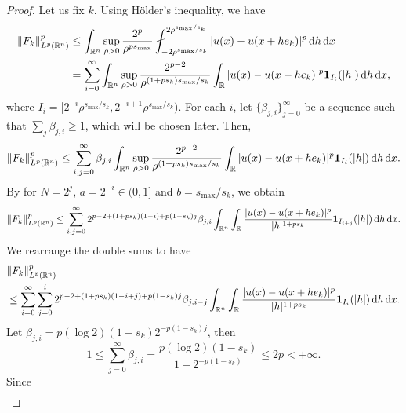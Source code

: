 \documentclass[11pt]{amsart}
\theoremstyle{plain}
\theoremstyle{definition}
\numberwithin{equation}{section}
\begin{document}
\begin{proof}
Let us fix $k$. Using H\"older's inequality, we have
\begin{equation*}
\begin{split}
\|F_k\|_{L^p(\mathbb{R}^n)}^p
&\leq \int_{\mathbb{R}^n} \sup_{\rho > 0} \frac{2^p}{\rho^{ps_{\max}}} \fint_{-2\rho^{s_{\max}/s_k}}^{2\rho^{s_{\max}/s_k}} |u(x) - u(x+he_k)|^p \,\mathrm{d}h \,\mathrm{d}x \\
&= \sum_{i=0}^\infty \int_{\mathbb{R}^n} \sup_{\rho > 0} \frac{2^{p-2}}{\rho^{(1+ps_k)s_{\max}/s_k}} \int_{\mathbb{R}} |u(x) - u(x+he_k)|^p {\bf 1}_{I_i}(|h|) \,\mathrm{d}h \,\mathrm{d}x,
\end{split}
\end{equation*}
where $I_i = [2^{-i}\rho^{s_{\max}/s_k}, 2^{-i+1}\rho^{s_{\max}/s_k})$. For each $i$, let $\lbrace \beta_{j,i} \rbrace_{j=0}^\infty$ be a sequence such that $\sum_j \beta_{j,i} \geq 1$, which will be chosen later. Then,
\begin{equation*}
\|F_k\|_{L^p(\mathbb{R}^n)}^p \leq \sum_{i,j=0}^\infty \beta_{j,i} \int_{\mathbb{R}^n} \sup_{\rho > 0} \frac{2^{p-2}}{\rho^{(1+ps_k)s_{\max}/s_k}} \int_{\mathbb{R}} |u(x) - u(x+he_k)|^p {\bf 1}_{I_i}(|h|) \,\mathrm{d}h \,\mathrm{d}x.
\end{equation*}
By  for $N = 2^j$, $a = 2^{-i} \in (0,1]$ and $b=s_{\max}/s_k$, we obtain
\begin{equation*}
\|F_k\|_{L^p(\mathbb{R}^n)}^p \leq \sum_{i,j=0}^\infty 2^{p-2+(1+ps_k)(1-i)+p(1-s_k)j} \beta_{j,i} \int_{\mathbb{R}^n} \int_{\mathbb{R}} \frac{|u(x) - u(x+he_k)|^p}{|h|^{1+ps_k}} {\bf 1}_{I_{i+j}} (|h|) \,\mathrm{d}h \,\mathrm{d}x.
\end{equation*}
We rearrange the double sums to have
\begin{equation*}
\begin{split}
&\|F_k\|_{L^p(\mathbb{R}^n)}^p \\
&\leq \sum_{i=0}^\infty \sum_{j=0}^i 2^{p-2+(1+ps_k)(1-i+j)+p(1-s_k)j} \beta_{j,i-j} \int_{\mathbb{R}^n} \int_{\mathbb{R}} \frac{|u(x) - u(x+he_k)|^p}{|h|^{1+ps_k}} {\bf 1}_{I_i}(|h|) \,\mathrm{d}h \,\mathrm{d}x.
\end{split}
\end{equation*}
Let $\beta_{j,i} = p(\log 2)(1-s_k) 2^{-p(1-s_k)j}$, then
\begin{equation*}
1 \leq \sum_{j=0}^\infty \beta_{j,i} = \frac{p(\log 2)(1-s_k)}{1-2^{-p(1-s_k)}} \leq 2p < +\infty.
\end{equation*}
Since
\begin{equation*}
\begin{split}

\end{split}
\end{equation*}
\end{proof}
\end{document}

